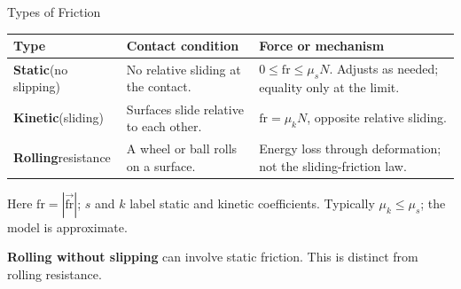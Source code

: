 \begin{frame}{Types of Friction}
  \par
  \small
  \renewcommand{\arraystretch}{1.25}
  \begin{tabularx}{\textwidth}{@{}
      >{\raggedright\arraybackslash}p{}
      >{\raggedright\arraybackslash}p{}
      >{\raggedright\arraybackslash}X@{}}
    \toprule
    \textbf{Type} & \textbf{Contact condition} & \textbf{Force or mechanism} \\
    \midrule
    \textbf{Static}\newline (no slipping)
      & No relative sliding at the contact.
      & \(0\le \mathrm{fr}\le\mu_sN\). Adjusts as needed; equality only at the limit. \\
    \addlinespace[.25em]
    \textbf{Kinetic}\newline (sliding)
      & Surfaces slide relative to each other.
      & \(\mathrm{fr}=\mu_kN\), opposite relative sliding. \\
    \addlinespace[.25em]
    \textbf{Rolling}\newline resistance
      & A wheel or ball rolls on a surface.
      & Energy loss through deformation; not the sliding-friction law. \\
    \bottomrule
  \end{tabularx}
  \medskip
  Here \(\mathrm{fr}=|\vec{\mathrm{fr}}|\); \(s\) and \(k\) label static and kinetic
  coefficients. Typically \(\mu_k\le\mu_s\); the model is approximate.

  \medskip
  \textbf{Rolling without slipping} can involve static friction.
  This is distinct from rolling resistance.
\end{frame}

